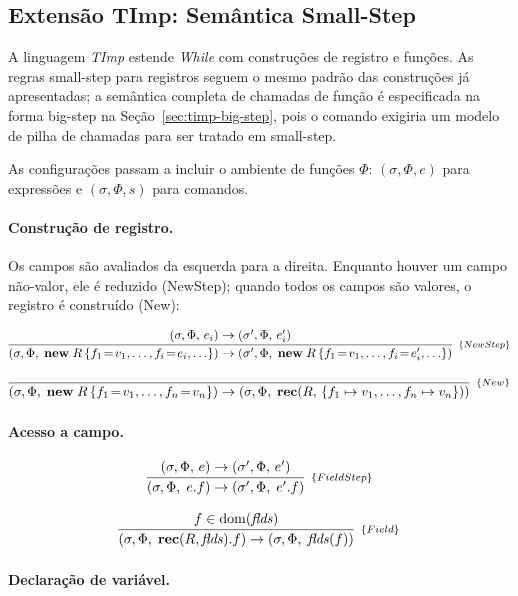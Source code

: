 \subsection{Extensão TImp: Semântica Small-Step}\label{sec:timp-small-step}

A linguagem \emph{TImp} estende \emph{While} com construções de
registro e funções. As regras small-step para registros seguem o
mesmo padrão das construções já apresentadas; a semântica completa de
chamadas de função é especificada na forma big-step na
Seção~\ref{sec:timp-big-step}, pois o comando 
exigiria um modelo de pilha de chamadas para ser tratado em small-step.

As configurações passam a incluir o ambiente de funções \(\Phi\):
\((\sigma, \Phi, e)\) para expressões e \((\sigma, \Phi, s)\) para
comandos.

\paragraph{Construção de registro.}

Os campos são avaliados da esquerda para a direita. Enquanto houver
um campo não-valor, ele é reduzido (NewStep); quando todos os campos
são valores, o registro é construído (New):

\[
  \infer[_{\{NewStep\}}]
  {(\sigma, \Phi,\;
    \mathbf{new}\; R\,\{f_1\!=\!v_1,\ldots,f_i\!=\!e_i,\ldots\})
    \to (\sigma', \Phi,\;
  \mathbf{new}\; R\,\{f_1\!=\!v_1,\ldots,f_i\!=\!e_i',\ldots\})}
  {(\sigma, \Phi,\, e_i) \to (\sigma', \Phi,\, e_i')}
\]

\[
  \infer[_{\{New\}}]
  {(\sigma, \Phi,\; \mathbf{new}\; R\,\{f_1\!=\!v_1,\ldots,f_n\!=\!v_n\})
    \to (\sigma, \Phi,\;
  \mathbf{rec}(R,\,\{f_1 \mapsto v_1,\ldots,f_n \mapsto v_n\}))}
  {}
\]

\paragraph{Acesso a campo.}

\[
  \infer[_{\{FieldStep\}}]
  {(\sigma, \Phi,\; e.f) \to (\sigma', \Phi,\; e'.f)}
  {(\sigma, \Phi,\, e) \to (\sigma', \Phi,\, e')}
\]

\[
  \infer[_{\{Field\}}]
  {(\sigma, \Phi,\; \mathbf{rec}(R,\mathit{flds}).f) \to
  (\sigma, \Phi,\; \mathit{flds}(f))}
  {f \in \mathrm{dom}(\mathit{flds})}
\]

\paragraph{Declaração de variável.}

